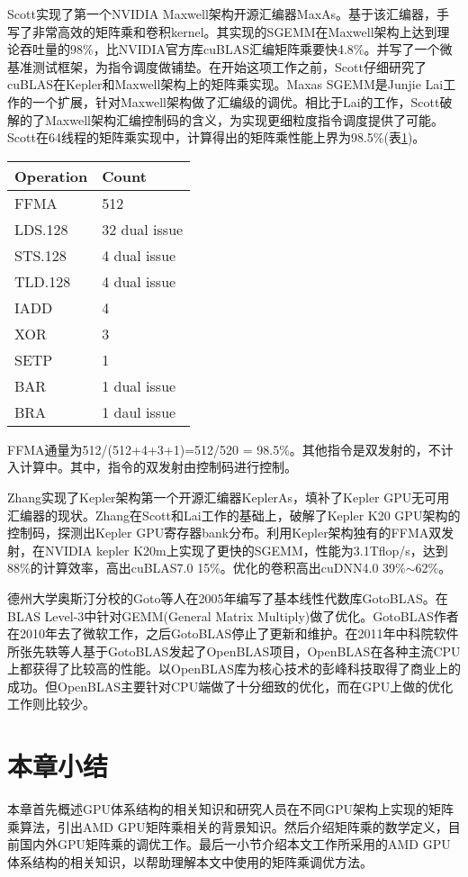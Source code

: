 Scott实现了第一个NVIDIA Maxwell架构开源汇编器MaxAs。基于该汇编器，手写了非常高效的矩阵乘和卷积kernel。其实现的SGEMM在Maxwell架构上达到理论吞吐量的98\%，比NVIDIA官方库cuBLAS汇编矩阵乘要快4.8\%。并写了一个微基准测试框架，为指令调度做铺垫。在开始这项工作之前，Scott仔细研究了cuBLAS在Kepler和Maxwell架构上的矩阵乘实现。Maxas SGEMM是Junjie Lai工作的一个扩展，针对Maxwell架构做了汇编级的调优。相比于Lai的工作，Scott破解的了Maxwell架构汇编控制码的含义，为实现更细粒度指令调度提供了可能。Scott在64线程的矩阵乘实现中，计算得出的矩阵乘性能上界为98.5\%(表\ref{tab:maxwellFFMA})。
\begin{table}[htbp]
	\label{tab:maxwellFFMA}
	\begin{center}
		\begin{tabular}{ | l | p{3cm} |}
			\hline
			Operation & Count \\ \hline
			FFMA & 512  \\ \hline
			LDS.128 & 32 dual issue \\ \hline
			STS.128 & 4 dual issue \\ \hline
			TLD.128 & 4 dual issue \\ \hline
			IADD & 4 \\ \hline
			XOR & 3 \\ \hline
			SETP & 1 \\ \hline
			BAR & 1 dual issue \\ \hline
			BRA & 1 daul issue \\
			\hline
		\end{tabular}
	\end{center}	
\end{table}

FFMA通量为512/(512+4+3+1)=512/520 = 98.5\%。其他指令是双发射的，不计入计算中。其中，指令的双发射由控制码进行控制。

Zhang实现了Kepler架构第一个开源汇编器KeplerAs，填补了Kepler GPU无可用汇编器的现状。Zhang在Scott和Lai工作的基础上，破解了Kepler K20 GPU架构的控制码，探测出Kepler GPU寄存器bank分布。利用Kepler架构独有的FFMA双发射，在NVIDIA kepler K20m上实现了更快的SGEMM，性能为3.1Tflop/s，达到88\%的计算效率，高出cuBLAS7.0 15\%。优化的卷积高出cuDNN4.0 39\%$\sim$62\%。

德州大学奥斯汀分校的Goto等人在2005年编写了基本线性代数库GotoBLAS。在BLAS Level-3中针对GEMM(General Matrix Multiply)做了优化。GotoBLAS作者在2010年去了微软工作，之后GotoBLAS停止了更新和维护。在2011年中科院软件所张先轶等人基于GotoBLAS发起了OpenBLAS项目，OpenBLAS在各种主流CPU上都获得了比较高的性能。以OpenBLAS库为核心技术的彭峰科技取得了商业上的成功。但OpenBLAS主要针对CPU端做了十分细致的优化，而在GPU上做的优化工作则比较少。


\section{本章小结}
本章首先概述GPU体系结构的相关知识和研究人员在不同GPU架构上实现的矩阵乘算法，引出AMD GPU矩阵乘相关的背景知识。然后介绍矩阵乘的数学定义，目前国内外GPU矩阵乘的调优工作。最后一小节介绍本文工作所采用的AMD GPU体系结构的相关知识，以帮助理解本文中使用的矩阵乘调优方法。




